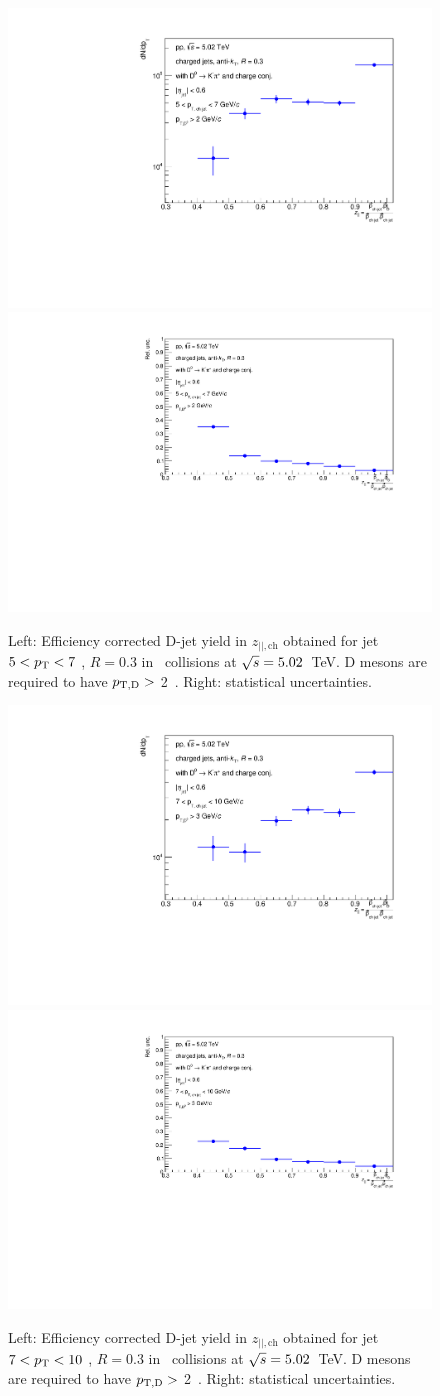 \begin{figure}[bth]
\centering
\includegraphics[width=0.45\linewidth]{pp_2sig/R3_jetbin_5_7/jetPtSpectrum_SB_RebinProb_pTD2}
\includegraphics[width=0.45\linewidth]{pp_2sig/R3_jetbin_5_7/jetPtSpectrumUnc_SB_Rebin_pTD2}
\caption{Left: Efficiency corrected D-jet yield in $z_{||,\text{ch}}$ obtained for jet $5<p_{\text T}<7$ \GeVc, $R=0.3$ in \pp\ collisions at $\sqrt{s}=5.02$~TeV. D mesons are required to have $p_{\mathrm{T,D}}>$ 2~\GeVc. Right: statistical uncertainties.}
\label{fig:eq_pp_effCorr5_7_R3}
\end{figure}

\begin{figure}[bth]
\centering
\includegraphics[width=0.45\linewidth]{pp_2sig/R3_jetbin_7_10/jetPtSpectrum_SB_RebinProb_pTD3}
\includegraphics[width=0.45\linewidth]{pp_2sig/R3_jetbin_7_10/jetPtSpectrumUnc_SB_Rebin_pTD3}
\caption{Left: Efficiency corrected D-jet yield in $z_{||,\text{ch}}$ obtained for jet $7<p_{\text T}<10$ \GeVc, $R=0.3$ in \pp\ collisions at $\sqrt{s}=5.02$~TeV. D mesons are required to have $p_{\mathrm{T,D}}>$ 2~\GeVc. Right: statistical uncertainties.}
\label{fig:eq_pp_effCorr7_10_R3}
\end{figure}


